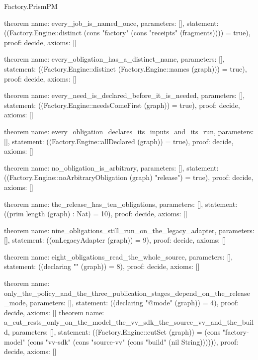 \begin{lexlean}{Factory.PrismPM}
\begin{semanticmodule}
theorem{
  name: every_job_is_named_once,
  parameters: [],
  statement: ((Factory.Engine::distinct (cons "factory" (cons "receipts" (fragments)))) = true),
  proof: decide{},
  axioms: []
}

theorem{
  name: every_obligation_has_a_distinct_name,
  parameters: [],
  statement: ((Factory.Engine::distinct (Factory.Engine::names (graph))) = true),
  proof: decide{},
  axioms: []
}

theorem{
  name: every_need_is_declared_before_it_is_needed,
  parameters: [],
  statement: ((Factory.Engine::needsComeFirst (graph)) = true),
  proof: decide{},
  axioms: []
}

theorem{
  name: every_obligation_declares_its_inputs_and_its_run,
  parameters: [],
  statement: ((Factory.Engine::allDeclared (graph)) = true),
  proof: decide{},
  axioms: []
}

theorem{
  name: no_obligation_is_arbitrary,
  parameters: [],
  statement: ((Factory.Engine::noArbitraryObligation (graph) "release") = true),
  proof: decide{},
  axioms: []
}

theorem{
  name: the_release_has_ten_obligations,
  parameters: [],
  statement: ((prim length (graph) : Nat) = 10),
  proof: decide{},
  axioms: []
}

theorem{
  name: nine_obligations_still_run_on_the_legacy_adapter,
  parameters: [],
  statement: ((onLegacyAdapter (graph)) = 9),
  proof: decide{},
  axioms: []
}

theorem{
  name: eight_obligations_read_the_whole_source,
  parameters: [],
  statement: ((declaring "" (graph)) = 8),
  proof: decide{},
  axioms: []
}

theorem{
  name: only_the_policy_and_the_three_publication_stages_depend_on_the_release_mode,
  parameters: [],
  statement: ((declaring "@mode" (graph)) = 4),
  proof: decide{},
  axioms: []
}
theorem{
  name: a_cut_rests_only_on_the_model_the_vv_sdk_the_source_vv_and_the_build,
  parameters: [],
  statement: ((Factory.Engine::cutSet (graph)) = (cons "factory-model" (cons "vv-sdk" (cons "source-vv" (cons "build" (nil String)))))),
  proof: decide{},
  axioms: []
}

\end{semanticmodule}
\end{lexlean}
